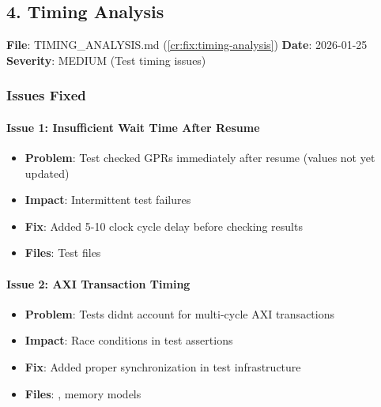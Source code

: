\subsection{4. Timing Analysis}\label{cr:fix:fixes-index:4-timing-analysis}

\begin{record}

\textbf{File}:
TIMING\_\allowbreak{}ANALYSIS.md (\cref{cr:fix:timing-analysis})
\textbf{Date}: 2026-01-25 \textbf{Severity}: \partialmark{} MEDIUM (Test
timing issues)

\end{record}

\subsubsection{Issues Fixed}\label{cr:fix:fixes-index:issues-fixed-2}

\paragraph{Issue 1: Insufficient Wait Time After Resume}\label{cr:fix:fixes-index:issue-1-insufficient-wait-time-after-resume}

\begin{record}

\begin{itemize}
\tightlist
\item
  \textbf{Problem}: Test checked GPRs immediately after resume (values
  not yet updated)
\item
  \textbf{Impact}: Intermittent test failures
\item
  \textbf{Fix}: Added 5-10 clock cycle delay before checking results
\item
  \textbf{Files}: Test files
\end{itemize}

\end{record}

\paragraph{Issue 2: AXI Transaction Timing}\label{cr:fix:fixes-index:issue-2-axi-transaction-timing}

\begin{record}

\begin{itemize}
\tightlist
\item
  \textbf{Problem}: Tests didn\textquotesingle t account for multi-cycle
  AXI transactions
\item
  \textbf{Impact}: Race conditions in test assertions
\item
  \textbf{Fix}: Added proper synchronization in test infrastructure
\item
  \textbf{Files}: , memory models
\end{itemize}

\end{record}

